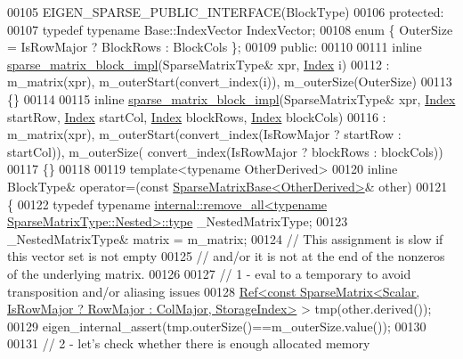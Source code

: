 \begin{DoxyCode}
00105     EIGEN\_SPARSE\_PUBLIC\_INTERFACE(BlockType)
00106 \textcolor{keyword}{protected}:
00107     \textcolor{keyword}{typedef} \textcolor{keyword}{typename} Base::IndexVector IndexVector;
00108     \textcolor{keyword}{enum} \{ OuterSize = IsRowMajor ? BlockRows : BlockCols \};
00109 \textcolor{keyword}{public}:
00110 
00111     \textcolor{keyword}{inline} \hyperlink{class_eigen_1_1internal_1_1sparse__matrix__block__impl}{sparse\_matrix\_block\_impl}(SparseMatrixType& xpr, 
      \hyperlink{group___core___module_a554f30542cc2316add4b1ea0a492ff02}{Index} i)
00112       : m\_matrix(xpr), m\_outerStart(convert\_index(i)), m\_outerSize(OuterSize)
00113     \{\}
00114 
00115     \textcolor{keyword}{inline} \hyperlink{class_eigen_1_1internal_1_1sparse__matrix__block__impl}{sparse\_matrix\_block\_impl}(SparseMatrixType& xpr, 
      \hyperlink{group___core___module_a554f30542cc2316add4b1ea0a492ff02}{Index} startRow, \hyperlink{group___core___module_a554f30542cc2316add4b1ea0a492ff02}{Index} startCol, \hyperlink{group___core___module_a554f30542cc2316add4b1ea0a492ff02}{Index} blockRows, \hyperlink{group___core___module_a554f30542cc2316add4b1ea0a492ff02}{Index} blockCols)
00116       : m\_matrix(xpr), m\_outerStart(convert\_index(IsRowMajor ? startRow : startCol)), m\_outerSize(
      convert\_index(IsRowMajor ? blockRows : blockCols))
00117     \{\}
00118 
00119     \textcolor{keyword}{template}<\textcolor{keyword}{typename} OtherDerived>
00120     \textcolor{keyword}{inline} BlockType& operator=(\textcolor{keyword}{const} \hyperlink{group___sparse_core___module_class_eigen_1_1_sparse_matrix_base}{SparseMatrixBase<OtherDerived>}& other)
00121     \{
00122       \textcolor{keyword}{typedef} \textcolor{keyword}{typename} 
      \hyperlink{group___sparse_core___module}{internal::remove\_all<typename SparseMatrixType::Nested>::type}
       \_NestedMatrixType;
00123       \_NestedMatrixType& matrix = m\_matrix;
00124       \textcolor{comment}{// This assignment is slow if this vector set is not empty}
00125       \textcolor{comment}{// and/or it is not at the end of the nonzeros of the underlying matrix.}
00126 
00127       \textcolor{comment}{// 1 - eval to a temporary to avoid transposition and/or aliasing issues}
00128       
      \hyperlink{group___core___module_class_eigen_1_1_ref}{Ref<const SparseMatrix<Scalar, IsRowMajor ? RowMajor : ColMajor, StorageIndex>}
       > tmp(other.derived());
00129       eigen\_internal\_assert(tmp.outerSize()==m\_outerSize.value());
00130 
00131       \textcolor{comment}{// 2 - let's check whether there is enough allocated memory}

\end{DoxyCode}
